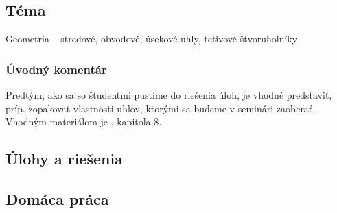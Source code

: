 
\subsection*{Téma}
Geometria -- stredové, obvodové, úsekové uhly, tetivové štvoruholníky
\subsubsection*{Úvodný komentár}

Predtým, ako sa so študentmi pustíme do riešenia úloh, je vhodné predstaviť, príp. zopakovať vlastnosti uhlov, ktorými sa budeme v seminári zaoberať. Vhodným materiálom je \cite{kadlecek1996}, kapitola 8.


\subsection*{Úlohy a riešenia}














\subsection*{Domáca práca}


